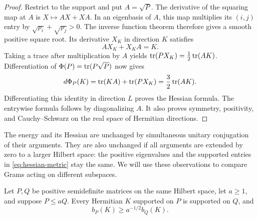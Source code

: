 \begin{proof}
Restrict to the support and put $A=\sqrt P$.
The derivative of the squaring map at $A$ is $X\mapsto AX+XA$.
In an eigenbasis of $A$, this map multiplies its $(i,j)$ entry by
$\sqrt{p_i}+\sqrt{p_j}>0$.  The inverse function theorem therefore
gives a smooth positive square root.  Its derivative $X_K$ in
direction $K$ satisfies
\[
 AX_K+X_KA=K.
\]
Taking a trace after multiplication by $A$ yields
$\operatorname{tr}(PX_K)=\tfrac12\operatorname{tr}(AK)$.  Differentiation of
$\Phi(P)=\operatorname{tr}(P\sqrt P)$ now gives
\[
 d\Phi_P(K)=\operatorname{tr}(KA)+\operatorname{tr}(PX_K)=\frac32\operatorname{tr}(AK).
\]
Differentiating this identity in direction $L$ proves the Hessian
formula.  The entrywise formula follows by diagonalizing $A$.
It also proves symmetry, positivity, and Cauchy--Schwarz on the
real space of Hermitian directions.
\end{proof}

The energy and its Hessian are unchanged by simultaneous unitary
conjugation of their arguments.  They are also unchanged if all
arguments are extended by zero to a larger Hilbert space: the
positive eigenvalues and the supported entries in
\eqref{eq:hessian-metric} stay the same.  We will use these
observations to compare Grams acting on different subspaces.

\begin{lemma}\label{lem:order}
Let $P,Q$ be positive semidefinite matrices on the same Hilbert space,
let $a\ge1$, and suppose $P\le aQ$.  Every Hermitian $K$ supported
on $P$ is supported on $Q$, and
\begin{equation}\label{eq:matrix-order}
 b_P(K)\ge a^{-1/2}b_Q(K).
\end{equation}
\end{lemma}

